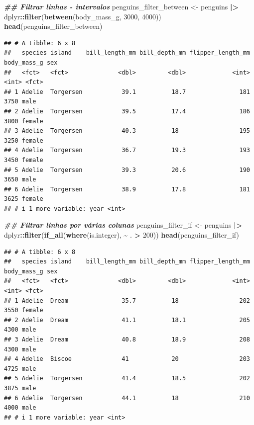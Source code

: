 \documentclass[
]{article}
\newenvironment{Shaded}{\begin{snugshade}}{\end{snugshade}}
\newcommand{\DecValTok}[1]{\textcolor[rgb]{0.00,0.00,0.81}{#1}}
\newcommand{\DocumentationTok}[1]{\textcolor[rgb]{0.56,0.35,0.01}{\textbf{\textit{#1}}}}
\newcommand{\FunctionTok}[1]{\textcolor[rgb]{0.13,0.29,0.53}{\textbf{#1}}}
\newcommand{\NormalTok}[1]{#1}
\newcommand{\OtherTok}[1]{\textcolor[rgb]{0.56,0.35,0.01}{#1}}
\newcommand{\SpecialCharTok}[1]{\textcolor[rgb]{0.81,0.36,0.00}{\textbf{#1}}}
\begin{document}
\begin{Shaded}
\begin{Highlighting}[]
\DocumentationTok{\#\# Filtrar linhas {-} intervalos}
\NormalTok{penguins\_filter\_between }\OtherTok{\textless{}{-}}\NormalTok{ penguins }\SpecialCharTok{|\textgreater{}} 
\NormalTok{    dplyr}\SpecialCharTok{::}\FunctionTok{filter}\NormalTok{(}\FunctionTok{between}\NormalTok{(body\_mass\_g, }\DecValTok{3000}\NormalTok{, }\DecValTok{4000}\NormalTok{))}
\FunctionTok{head}\NormalTok{(penguins\_filter\_between)}
\end{Highlighting}
\end{Shaded}

\begin{verbatim}
## # A tibble: 6 x 8
##   species island    bill_length_mm bill_depth_mm flipper_length_mm body_mass_g sex   
##   <fct>   <fct>              <dbl>         <dbl>             <int>       <int> <fct> 
## 1 Adelie  Torgersen           39.1          18.7               181        3750 male  
## 2 Adelie  Torgersen           39.5          17.4               186        3800 female
## 3 Adelie  Torgersen           40.3          18                 195        3250 female
## 4 Adelie  Torgersen           36.7          19.3               193        3450 female
## 5 Adelie  Torgersen           39.3          20.6               190        3650 male  
## 6 Adelie  Torgersen           38.9          17.8               181        3625 female
## # i 1 more variable: year <int>
\end{verbatim}

\begin{Shaded}
\begin{Highlighting}[]
\DocumentationTok{\#\# Filtrar linhas por várias colunas}
\NormalTok{penguins\_filter\_if }\OtherTok{\textless{}{-}}\NormalTok{ penguins }\SpecialCharTok{|\textgreater{}} 
\NormalTok{    dplyr}\SpecialCharTok{::}\FunctionTok{filter}\NormalTok{(}\FunctionTok{if\_all}\NormalTok{(}\FunctionTok{where}\NormalTok{(is.integer), }\SpecialCharTok{\textasciitilde{}}\NormalTok{ . }\SpecialCharTok{\textgreater{}} \DecValTok{200}\NormalTok{))}
\FunctionTok{head}\NormalTok{(penguins\_filter\_if)}
\end{Highlighting}
\end{Shaded}

\begin{verbatim}
## # A tibble: 6 x 8
##   species island    bill_length_mm bill_depth_mm flipper_length_mm body_mass_g sex   
##   <fct>   <fct>              <dbl>         <dbl>             <int>       <int> <fct> 
## 1 Adelie  Dream               35.7          18                 202        3550 female
## 2 Adelie  Dream               41.1          18.1               205        4300 male  
## 3 Adelie  Dream               40.8          18.9               208        4300 male  
## 4 Adelie  Biscoe              41            20                 203        4725 male  
## 5 Adelie  Torgersen           41.4          18.5               202        3875 male  
## 6 Adelie  Torgersen           44.1          18                 210        4000 male  
## # i 1 more variable: year <int>
\end{verbatim}
\end{document}
